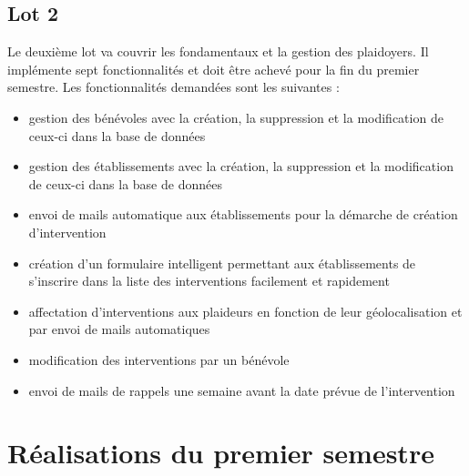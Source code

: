 \documentclass[asi]{picInsa}
\begin{document}
\subsection{Lot 2}
Le deuxième lot va couvrir les fondamentaux et la gestion des plaidoyers. Il implémente sept fonctionnalités et doit être achevé pour la fin du premier semestre. Les fonctionnalités demandées sont les suivantes :
\begin{itemize}
	\item gestion des bénévoles avec la création, la suppression et la modification de ceux-ci dans la base de données
	\item gestion des établissements avec la création, la suppression et la modification de ceux-ci dans la base de données
	\item envoi de mails automatique aux établissements pour la démarche de création d'intervention
	\item création d'un formulaire intelligent permettant aux établissements de s'inscrire dans la liste des interventions facilement et rapidement
	\item affectation d'interventions aux plaideurs en fonction de leur géolocalisation et par envoi de mails automatiques
	\item modification des interventions par un bénévole
	\item envoi de mails de rappels une semaine avant la date prévue de l'intervention
\end{itemize}



\section{Réalisations du premier semestre}
\end{document}
